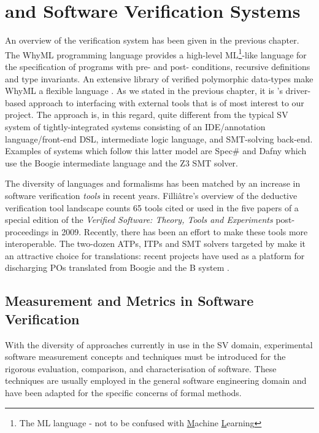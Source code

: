 \section{\why and Software Verification Systems}
\label{sec:lrsv}

An overview of the \why verification system \cite{why:shephard,why:whereprovers} has been given in the previous chapter. The WhyML programming language provides a high-level ML\footnote{The ML language - not to be confused with \underline{M}achine \underline{L}earning}-like language for the specification of programs with pre- and post- conditions, recursive definitions and type invariants. An extensive library of verified polymorphic data-types make WhyML a flexible language \cite{verifythis,why:polymorphic}. As we stated in the previous chapter, it is \why's driver-based approach to interfacing with external tools that is of most interest to our project. The \why approach is, in this regard, quite different from the typical SV system of tightly-integrated systems consisting of an IDE/annotation language/front-end DSL, intermediate logic language, and SMT-solving back-end. Examples of systems which follow this latter model are Spec\# \cite{spec} and Dafny \cite{Dafny} which use the Boogie \cite{Boogie} intermediate language and the Z3 \cite{Z3} SMT solver.

The diversity of languages and formalisms has been matched by an increase in software verification \textit{tools} in recent years. Filli{\^a}tre's overview of the deductive verification tool landscape \cite{deductiveSV} counts 65 tools cited or used in the five papers of a special edition of the \textit{Verified Software: Theory, Tools and Experiments} post-proceedings in 2009. Recently, there has been an effort to make these tools more interoperable. The two-dozen ATPs, ITPs and SMT solvers targeted by \why make it an attractive choice for translations: recent projects have used \why as a platform for discharging POs translated from Boogie \cite{b2w} and the B system \cite{rodinplugin,atelierB2w}. 

\subsection{Measurement and Metrics in Software Verification}
\label{sub:lrsvmm}

With the diversity of approaches currently in use in the SV domain, experimental software measurement concepts and techniques must be introduced for the rigorous evaluation, comparison, and characterisation of software. These techniques are usually employed in the general software engineering domain and have been adapted for the specific concerns of formal methods. 

